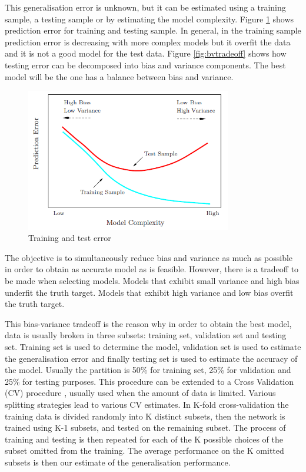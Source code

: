This generalisation error is unknown, but it can be estimated using a training sample, a testing sample or by estimating the model complexity. Figure \ref{fig:traintesterror} shows prediction error for training and testing sample.  In general, in the training sample prediction error is decreasing with more complex models but it overfit the data and it is not a good model for the test data. Figure \ref{fig:bvtradeoff} shows how testing error can be decomposed into bias and variance components. The best model will be the one has a balance between bias and variance.

\begin{figure}[!h]
  \centering
  \includegraphics[width=0.8\textwidth]{img/model_complexity}
  \caption{Training and test error}
  \label{fig:traintesterror}
\end{figure}


The objective is to simultaneously reduce bias and variance as much as possible in order to obtain as accurate model as is feasible.  However, there is a tradeoff to be made when selecting models. Models that exhibit small variance and high bias underfit the truth target.  Models that exhibit high variance and low bias overfit the truth target.

This bias-variance tradeoff is the reason why in order to obtain the best model, data is usually broken in three subsets: training set, validation set and testing set. Training set is used to determine the model, validation set is used to estimate the generalisation error and finally testing set is used to estimate the accuracy of the model. Usually the partition is 50\% for training set, 25\% for validation and 25\% for testing purposes. This procedure can be extended to a Cross Validation (CV) procedure \cite{geisser1975}, usually used when the amount of data is limited. Various splitting strategies lead to various CV estimates. In K-fold cross-validation the training data is divided randomly into K distinct subsets, then the network is trained using K-1 subsets, and tested on the remaining subset. The process of training and testing is then repeated for each of the K possible choices of the subset omitted from the training. The average performance on the K omitted subsets is then our estimate of the generalisation performance.

